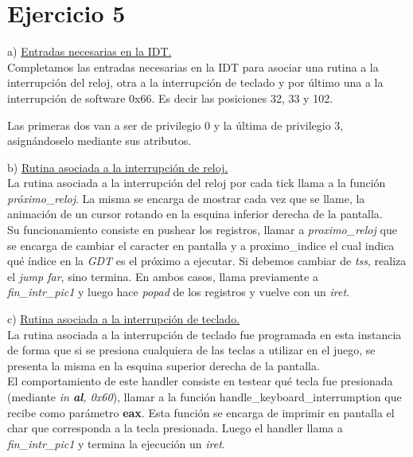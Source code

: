 \documentclass[a4paper]{article}
\begin{document}
\newpage
\section{Ejercicio 5}

{\large a)} \underline{Entradas necesarias en la IDT.}\\

Completamos las entradas necesarias en la IDT para asociar una rutina a la interrupci\'on del
reloj, otra a la interrupci\'on de teclado y por \'ultimo una a la interrupci\'on de software 0x66. Es decir las posiciones 32, 33 y 102.

Las primeras dos van a ser de privilegio 0 y la \'ultima de privilegio 3, asign\'andoselo mediante sus atributos.\\

\bigskip

{\large b)} \underline{Rutina asociada a la interrupci\'on de reloj.}\\

La rutina asociada a la interrupci\'on del reloj por cada tick llama a la funci\'on \textit{pr\'oximo_reloj}. La misma se encarga de mostrar cada vez que se llame, la animaci\'on de un cursor rotando en la esquina inferior derecha de la pantalla. \\

Su funcionamiento consiste en pushear los registros, llamar a \textit{proximo_reloj} que se encarga de cambiar el caracter en pantalla y a proximo_indice el cual indica qu\'e \'indice en la \emph{GDT} es el pr\'oximo a ejecutar. Si debemos cambiar de \emph{tss}, realiza el \textit{jump far}, sino termina. En ambos casos, llama previamente a \\
\textit{fin_intr_pic1} y luego hace \textit{popad} de los registros y vuelve con un \textit{iret}.\\
\bigskip

{\large c)} \underline{Rutina asociada a la interrupci\'on de teclado.}\\

La rutina asociada a la interrupci\'on de teclado fue programada en esta instancia de forma que si se presiona cualquiera de las teclas a utilizar en el juego, se presenta la misma en la esquina superior derecha de la pantalla. \\

El comportamiento de este handler consiste en testear qu\'e tecla fue presionada (mediante \textit{in \textbf{al}, 0x60}), llamar a la funci\'on handle_keyboard_interrumption que recibe como par\'ametro \textbf{eax}. Esta funci\'on se encarga de imprimir en pantalla el char que corresponda a la tecla presionada. Luego el handler llama a \textit{fin_intr_pic1} y termina la ejecuci\'on un \textit{iret}. \\
\bigskip
\end{document}
